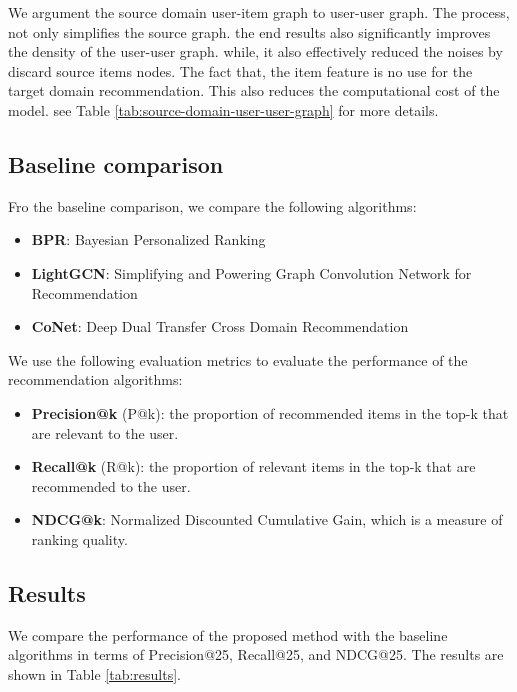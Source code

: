 We argument the source domain user-item graph to user-user graph.
The process, not only simplifies the source graph. the end results also significantly improves the density of the user-user graph.
while, it also effectively reduced the noises by discard source items nodes.
The fact that, the item feature is no use for the target domain recommendation. This also reduces the computational cost of the model.
see Table \ref{tab:source-domain-user-user-graph} for more details.



\subsection{Baseline comparison}

Fro the baseline comparison, we compare the following algorithms:

\begin{itemize}
    \item \textbf{BPR}: Bayesian Personalized Ranking
    \item \textbf{LightGCN}: Simplifying and Powering Graph Convolution Network for Recommendation
    \item \textbf{CoNet}: Deep Dual Transfer Cross Domain Recommendation
\end{itemize}

We use the following evaluation metrics to evaluate the performance of the recommendation algorithms:

\begin{itemize}
    \item \textbf{Precision@k} (P@k): the proportion of recommended items in the top-k that are relevant to the user.
    \item \textbf{Recall@k} (R@k): the proportion of relevant items in the top-k that are recommended to the user.
    \item \textbf{NDCG@k}: Normalized Discounted Cumulative Gain, which is a measure of ranking quality.
\end{itemize}


\subsection{Results}

We compare the performance of the proposed method with the baseline algorithms in terms of Precision@25, Recall@25, and NDCG@25. The results are shown in Table \ref{tab:results}.

